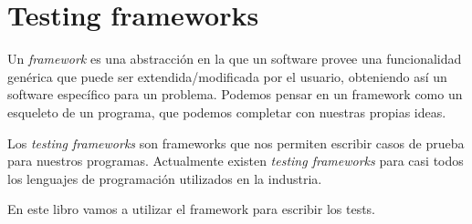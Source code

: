 \section{Testing frameworks}
  \label{subsec:testing-frameworks}

  Un \textit{framework} es una abstracción en la que un software provee una
  funcionalidad genérica que puede ser extendida/modificada por el usuario, obteniendo así un
  software específico para un problema.
  Podemos pensar en un framework como un esqueleto de un programa, que podemos completar con
  nuestras propias ideas.

  Los \textit{testing frameworks} son frameworks que nos permiten 
  escribir casos de prueba para nuestros programas.
  Actualmente existen \textit{testing frameworks} para casi todos los lenguajes de programación
  utilizados en la industria.

  En este libro vamos a utilizar el framework  para escribir los tests.
